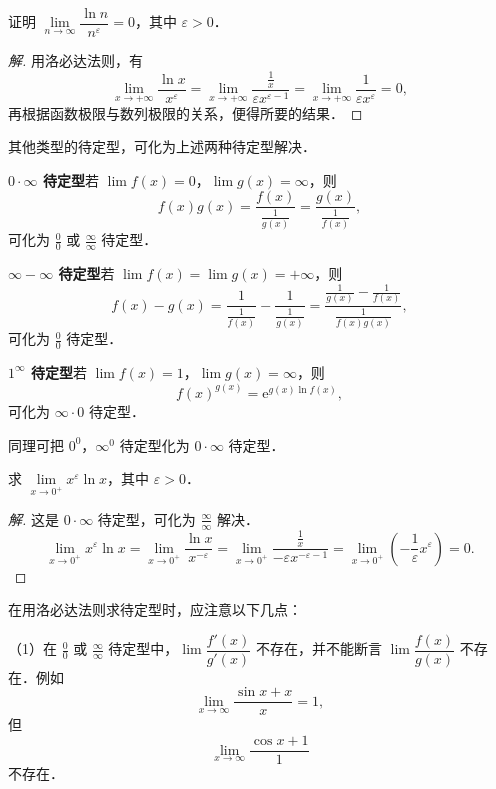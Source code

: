 \begin{example}
证明 $\lim\limits_{n\to\infty}\dfrac{\ln n}{n^{\varepsilon}} = 0$，其中 $\varepsilon > 0$．
\end{example}

\begin{proof}[解]
用洛必达法则，有
\[
\lim_{x\to+\infty}\frac{\ln x}{x^{\varepsilon}}
= \lim_{x\to+\infty}\frac{\frac{1}{x}}{\varepsilon x^{\varepsilon-1}}
= \lim_{x\to+\infty}\frac{1}{\varepsilon x^{\varepsilon}} = 0,
\]
再根据函数极限与数列极限的关系，便得所要的结果．
\end{proof}

其他类型的待定型，可化为上述两种待定型解决．

\textbf{$0\cdot\infty$ 待定型}\quad 若 $\lim f(x) = 0$，$\lim g(x) = \infty$，则
\[
f(x)g(x) = \frac{f(x)}{\frac{1}{g(x)}} = \frac{g(x)}{\frac{1}{f(x)}},
\]
可化为 $\frac{0}{0}$ 或 $\frac{\infty}{\infty}$ 待定型．

\textbf{$\infty - \infty$ 待定型}\quad 若 $\lim f(x) = \lim g(x) = +\infty$，则
\[
f(x) - g(x) = \frac{1}{\frac{1}{f(x)}} - \frac{1}{\frac{1}{g(x)}}
= \frac{\frac{1}{g(x)} - \frac{1}{f(x)}}{\frac{1}{f(x)g(x)}},
\]
可化为 $\frac{0}{0}$ 待定型．

\textbf{$1^{\infty}$ 待定型}\quad 若 $\lim f(x) = 1$，$\lim g(x) = \infty$，则
\[
f(x)^{g(x)} = \mathrm{e}^{g(x)\ln f(x)},
\]
可化为 $\infty\cdot 0$ 待定型．

同理可把 $0^{0}$，$\infty^{0}$ 待定型化为 $0\cdot\infty$ 待定型．

\begin{example}
求 $\lim\limits_{x\to 0^{+}} x^{\varepsilon}\ln x$，其中 $\varepsilon > 0$．
\end{example}

\begin{proof}[解]
这是 $0\cdot\infty$ 待定型，可化为 $\frac{\infty}{\infty}$ 解决．
\[
\lim_{x\to 0^{+}} x^{\varepsilon}\ln x
= \lim_{x\to 0^{+}} \frac{\ln x}{x^{-\varepsilon}}
= \lim_{x\to 0^{+}} \frac{\frac{1}{x}}{-\varepsilon x^{-\varepsilon-1}}
= \lim_{x\to 0^{+}} \left(-\frac{1}{\varepsilon}x^{\varepsilon}\right) = 0.
\]
\end{proof}

在用洛必达法则求待定型时，应注意以下几点：

（1）在 $\frac{0}{0}$ 或 $\frac{\infty}{\infty}$ 待定型中，$\lim\dfrac{f'(x)}{g'(x)}$ 不存在，并不能断言 $\lim\dfrac{f(x)}{g(x)}$ 不存在．例如
\[
\lim_{x\to\infty}\frac{\sin x + x}{x} = 1,
\]
但
\[
\lim_{x\to\infty}\frac{\cos x + 1}{1}
\]
不存在．

